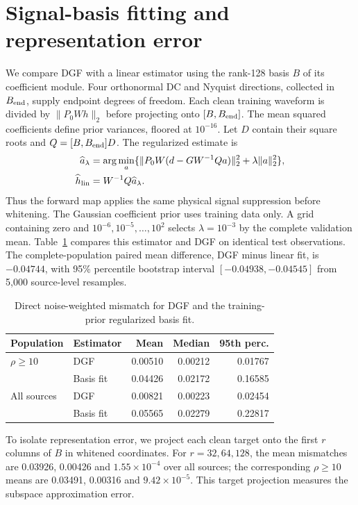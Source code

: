 \documentclass[10pt,prd,aps,a4paper,twocolumn,superscriptaddress,nofootinbib,floatfix]{revtex4-2}
\begin{document}
\section{Signal-basis fitting and representation error}\label{app:basis_comparison}
We compare DGF with a linear estimator using the rank-128 basis $B$ of its coefficient module. Four orthonormal DC and Nyquist directions, collected in $B_{\rm end}$, supply endpoint degrees of freedom. Each clean training waveform is divided by $\|P_0Wh\|_2$ before projecting onto $[B,B_{\rm end}]$. The mean squared coefficients define prior variances, floored at $10^{-16}$. Let $D$ contain their square roots and $Q=[B,B_{\rm end}]D$. The regularized estimate is
\begin{align}
\widehat a_\lambda&=\arg\min_a\{\|P_0W(d-GW^{-1}Qa)\|_2^2+\lambda\|a\|_2^2\},\nonumber\\
\widehat h_{\rm lin}&=W^{-1}Q\widehat a_\lambda.
\end{align}
Thus the forward map applies the same physical signal suppression before whitening. The Gaussian coefficient prior uses training data only. A grid containing zero and $10^{-6},10^{-5},\ldots,10^2$ selects $\lambda=10^{-3}$ by the complete validation mean. Table~\ref{tab:basis_fit} compares this estimator and DGF on identical test observations. The complete-population paired mean difference, DGF minus linear fit, is $-0.04744$, with 95\% percentile bootstrap interval $[-0.04938,-0.04545]$ from 5,000 source-level resamples.

\begin{table}[t]\centering\setlength{\tabcolsep}{3pt}
\caption{Direct noise-weighted mismatch for DGF and the training-prior regularized basis fit.}\label{tab:basis_fit}
\begin{tabular}{llrrr}\hline\hline
Population & Estimator & Mean & Median & 95th perc.\\\hline
$\rho\ge10$ & DGF & 0.00510 & 0.00212 & 0.01767\\
& Basis fit & 0.04426 & 0.02172 & 0.16585\\
All sources & DGF & 0.00821 & 0.00223 & 0.02454\\
& Basis fit & 0.05565 & 0.02279 & 0.22817\\
\hline\hline\end{tabular}\end{table}

To isolate representation error, we project each clean target onto the first $r$ columns of $B$ in whitened coordinates. For $r=32,64,128$, the mean mismatches are 0.03926, 0.00426 and $1.55\times10^{-4}$ over all sources; the corresponding $\rho\ge10$ means are 0.03491, 0.00316 and $9.42\times10^{-5}$. This target projection measures the subspace approximation error.


\clearpage

\end{document}
